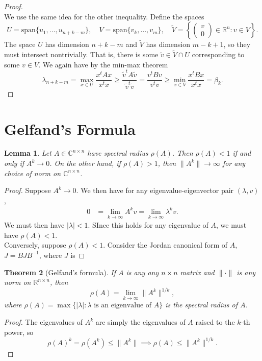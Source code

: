 \documentclass[11pt,letterpaper]{article}
\newcommand{\complex}{\mathbb{C}}
\newcommand{\reals}{\mathbb{R}}
\newcommand{\spn}{\text{span}}
\newtheorem{theorem}{Theorem}[section]
\newtheorem{lemma}[theorem]{Lemma}
\theoremstyle{definition}
\theoremstyle{remark}
\begin{document}
\begin{proof}
\[	\]
	We use the same idea for the other inequality. Define the spaces
	\[
	U = \spn\{u_1, \ldots, u_{n+k-m}\},\quad V = \spn\{v_k, \ldots, v_m\},\quad \tilde{V} = \left\{\begin{pmatrix}
		v\\0
	\end{pmatrix}\in \reals^n: v\in V\right\}.
	\]
	The space $U$ has dimension $n+k-m$ and $\tilde{V}$ has dimension $m-k+1$, so they must intersect nontrivially. That is, there is some $\tilde{v}\in \tilde{V}\cap U$ corresponding to some $v\in V$. We again have by the min-max theorem
	\[
	\lambda_{n+k-m} = \max_{x\in U}\frac{x^tAx}{x^tx} \geq \frac{\tilde{v}^tA\tilde{v}}{\tilde{v}^t\tilde{v}} = \frac{v^tBv}{v^tv} \geq \min_{x\in V}\frac{x^tBx}{x^tx} = \beta_k.
	\]
\end{proof}










\section{Gelfand's Formula}

\begin{lemma}
	Let $A\in \complex^{n\times n}$ have spectral radius $\rho(A)$. Then $\rho(A)<1$ if and only if $A^k \to 0$. On the other hand, if $\rho(A)>1$, then $\|A^k\|\to \infty$ for any choice of norm on $\complex^{n\times n}$.
\end{lemma}
\begin{proof}
	Suppose $A^k\to 0$. We then have for any eigenvalue-eigenvector pair $(\lambda, v)$,
	\begin{align*}
		0 &= \lim_{k\to \infty}A^k v = \lim_{k\to \infty}\lambda^k v.
	\end{align*}
	We must then have $|\lambda|<1$. SInce this holds for any eigenvalue of $A$, we must have $\rho(A)<1$.\\

	\noindent Conversely, suppose $\rho(A)<1$. Consider the Jordan canonical form of $A$, $J = BJB^{-1}$, where $J$ is 
\end{proof}

\begin{theorem}[Gelfand's formula]
	If $A$ is any any $n\times n$ matrix and $\|\cdot \|$ is any norm on $\reals^{n\times n}$, then
	\[
	\rho(A) = \lim_{k\to \infty}\|A^k\|^{1/k},
	\]
	where $\rho(A) = \max\{|\lambda|: \lambda\text{ is an eigenvalue of } A\}$ is the spectral radius of $A$.
\end{theorem}
\begin{proof}
	The eigenvalues of $A^k$ are simply the eigenvalues of $A$ raised to the $k$-th power, so
	\[
	\rho(A)^k = \rho(A^k) \leq \|A^k\| \implies \rho(A) \leq \|A^k\|^{1/k}.
	\]
\end{proof}
\end{document}
